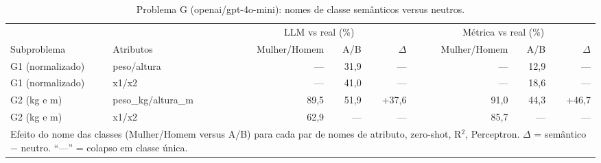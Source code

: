 \begin{table}[htbp]
\centering
\small
\caption{Problema G (openai/gpt-4o-mini): nomes de classe semânticos versus neutros.}
\label{tab:bloco3_G_nomes_semanticos_vs_neutros_gpt4mini}
\begin{tabular}{llrrrrrr}
\toprule
 &  & \multicolumn{3}{c}{LLM vs real (\%)} & \multicolumn{3}{c}{Métrica vs real (\%)} \\ \cmidrule(lr){3-5} \cmidrule(lr){6-8}
Subproblema & Atributos & Mulher/Homem & A/B & $\Delta$ & Mulher/Homem & A/B & $\Delta$ \\
\midrule
G1 (normalizado) & peso/altura & — & 31,9 & — & — & 12,9 & — \\
G1 (normalizado) & x1/x2 & — & 41,0 & — & — & 18,6 & — \\
\midrule
G2 (kg e m) & peso\_kg/altura\_m & 89,5 & 51,9 & +37,6 & 91,0 & 44,3 & +46,7 \\
G2 (kg e m) & x1/x2 & 62,9 & — & — & 85,7 & — & — \\
\bottomrule
\multicolumn{8}{p{0.95\linewidth}}{\footnotesize Efeito do nome das classes (Mulher/Homem versus A/B) para cada par de nomes de atributo, zero-shot, R$^2$, Perceptron. $\Delta$ = semântico $-$ neutro. ``—'' = colapso em classe única.} \\
\end{tabular}
\end{table}

